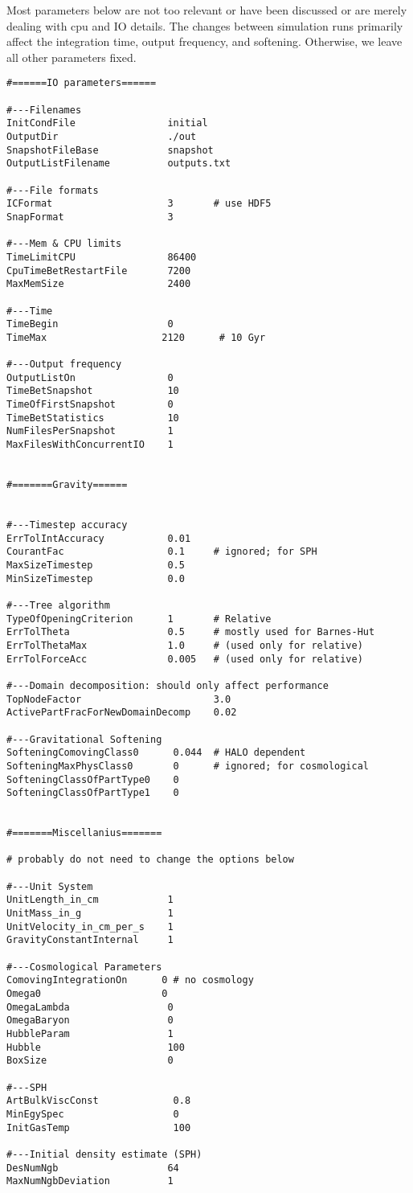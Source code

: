 Most parameters below are not too relevant or have been discussed or are
merely dealing with cpu and IO details. The changes between simulation
runs primarily affect the integration time, output frequency, and
softening. Otherwise, we leave all other parameters fixed.

\begin{verbatim}
#======IO parameters======

#---Filenames
InitCondFile                initial
OutputDir                   ./out
SnapshotFileBase            snapshot
OutputListFilename          outputs.txt

#---File formats 
ICFormat                    3       # use HDF5
SnapFormat                  3 

#---Mem & CPU limits
TimeLimitCPU                86400
CpuTimeBetRestartFile       7200
MaxMemSize                  2400

#---Time
TimeBegin                   0
TimeMax                    2120      # 10 Gyr

#---Output frequency
OutputListOn                0
TimeBetSnapshot             10
TimeOfFirstSnapshot         0 
TimeBetStatistics           10
NumFilesPerSnapshot         1
MaxFilesWithConcurrentIO    1 


#=======Gravity======


#---Timestep accuracy
ErrTolIntAccuracy           0.01
CourantFac                  0.1     # ignored; for SPH
MaxSizeTimestep             0.5
MinSizeTimestep             0.0 

#---Tree algorithm
TypeOfOpeningCriterion      1       # Relative
ErrTolTheta                 0.5     # mostly used for Barnes-Hut
ErrTolThetaMax              1.0     # (used only for relative)
ErrTolForceAcc              0.005   # (used only for relative)

#---Domain decomposition: should only affect performance
TopNodeFactor                       3.0
ActivePartFracForNewDomainDecomp    0.02

#---Gravitational Softening
SofteningComovingClass0      0.044  # HALO dependent
SofteningMaxPhysClass0       0      # ignored; for cosmological
SofteningClassOfPartType0    0
SofteningClassOfPartType1    0


#=======Miscellanius=======

# probably do not need to change the options below 

#---Unit System
UnitLength_in_cm            1 
UnitMass_in_g               1
UnitVelocity_in_cm_per_s    1 
GravityConstantInternal     1

#---Cosmological Parameters 
ComovingIntegrationOn      0 # no cosmology
Omega0                     0
OmegaLambda                 0 
OmegaBaryon                 0
HubbleParam                 1
Hubble                      100
BoxSize                     0

#---SPH
ArtBulkViscConst             0.8
MinEgySpec                   0
InitGasTemp                  100

#---Initial density estimate (SPH)
DesNumNgb                   64
MaxNumNgbDeviation          1
\end{verbatim}
